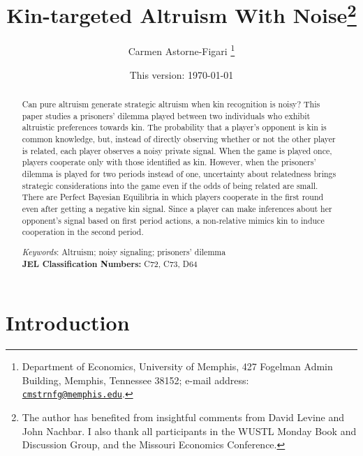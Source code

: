 \documentclass[12pt]{article}
\title{Kin-targeted Altruism With Noise\thanks{The author has benefited from insightful comments from David Levine and John Nachbar. I also thank all participants in the WUSTL Monday Book and Discussion Group, and the Missouri Economics Conference.}}
\author{Carmen Astorne-Figari \thanks{Department of Economics, University of Memphis, 427 Fogelman Admin Building, Memphis, Tennessee 38152;  e-mail address: \href{mailto:cmstrnfg@memphis.edu}{\tt cmstrnfg@memphis.edu}.}}
\date{This version: \today}
\begin{document}
\maketitle
\begin{abstract}
\thispagestyle{empty}
\bigskip
Can pure altruism generate strategic altruism when kin recognition is noisy? This paper studies a prisoners' dilemma played between two individuals who exhibit altruistic preferences towards kin. The probability that a player's opponent is kin is common knowledge, but, instead of directly observing whether or not the other player is related, each player observes a noisy private signal. When the game is played once, players cooperate only with those identified as kin. However, when the prisoners' dilemma is played for two periods instead of one, uncertainty about relatedness brings strategic considerations into the game even if the odds of being related are small. There are Perfect Bayesian Equilibria in which players cooperate in the first round even after getting a negative kin signal. Since a player can make inferences about her opponent's signal based on first period actions, a non-relative mimics kin to induce cooperation in the second period.
\\
\bigskip \bigskip

\noindent \textit{Keywords}: Altruism; noisy signaling; prisoners' dilemma\\

\noindent \textbf{JEL Classification Numbers:} C72, C73, D64
\end{abstract}

\newpage
\setcounter{page}{1} \doublespacing \section{Introduction}
\end{document}
